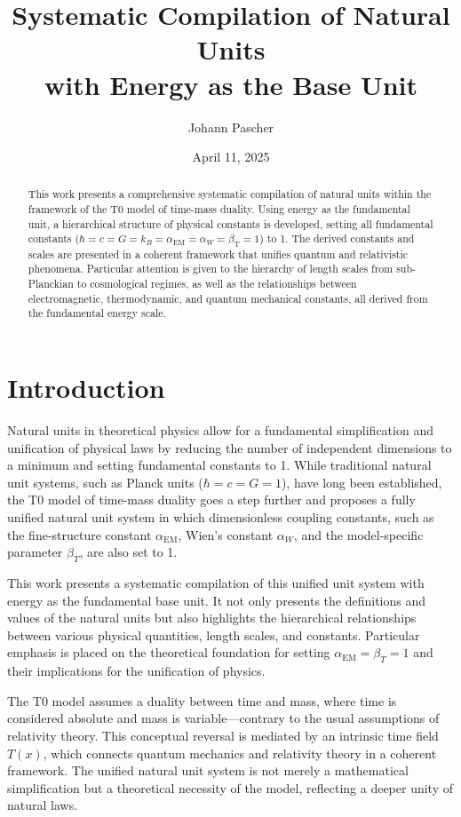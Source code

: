 \documentclass[12pt,a4paper]{article}
\title{Systematic Compilation of Natural Units \\with Energy as the Base Unit}
\author{Johann Pascher}
\date{April 11, 2025}
\newcommand{\Tfield}{T(x)}
\newcommand{\alphaEM}{\alpha_{\text{EM}}}
\newcommand{\betaT}{\beta_{\text{T}}}
\begin{document}
	
	\maketitle
	
	\begin{abstract}
		This work presents a comprehensive systematic compilation of natural units within the framework of the T0 model of time-mass duality. Using energy as the fundamental unit, a hierarchical structure of physical constants is developed, setting all fundamental constants ($\hbar = c = G = k_B = \alphaEM = \alpha_W = \betaT = 1$) to 1. The derived constants and scales are presented in a coherent framework that unifies quantum and relativistic phenomena. Particular attention is given to the hierarchy of length scales from sub-Planckian to cosmological regimes, as well as the relationships between electromagnetic, thermodynamic, and quantum mechanical constants, all derived from the fundamental energy scale.
	\end{abstract}
	
	\tableofcontents
	\newpage
	
	\section{Introduction}
	
	Natural units in theoretical physics allow for a fundamental simplification and unification of physical laws by reducing the number of independent dimensions to a minimum and setting fundamental constants to 1. While traditional natural unit systems, such as Planck units ($\hbar = c = G = 1$), have long been established, the T0 model of time-mass duality goes a step further and proposes a fully unified natural unit system in which dimensionless coupling constants, such as the fine-structure constant $\alpha_{\text{EM}}$, Wien’s constant $\alpha_W$, and the model-specific parameter $\beta_T$, are also set to 1.
	
	This work presents a systematic compilation of this unified unit system with energy as the fundamental base unit. It not only presents the definitions and values of the natural units but also highlights the hierarchical relationships between various physical quantities, length scales, and constants. Particular emphasis is placed on the theoretical foundation for setting $\alpha_{\text{EM}} = \beta_T = 1$ and their implications for the unification of physics.
	
	The T0 model assumes a duality between time and mass, where time is considered absolute and mass is variable—contrary to the usual assumptions of relativity theory. This conceptual reversal is mediated by an intrinsic time field $\Tfield$, which connects quantum mechanics and relativity theory in a coherent framework. The unified natural unit system is not merely a mathematical simplification but a theoretical necessity of the model, reflecting a deeper unity of natural laws.
	
\end{document}
